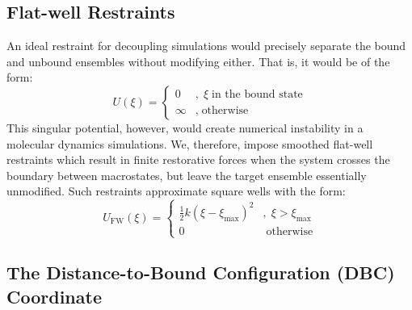\documentclass[9pt,tutorial]{Styling/livecoms}
\begin{document}
\subsection{Flat-well Restraints}

An ideal restraint for decoupling simulations would precisely separate the bound and unbound ensembles without modifying either. That is, it would be of the form:
\begin{equation} \label{eq:squareWell}
    U(\xi) = \begin{cases}
        0 &, \; \xi\; \text{in the bound state}\\
        \infty &, \; \text{otherwise}
    \end{cases}
\end{equation}
\noindent This singular potential, however, would create numerical instability in a molecular dynamics simulations. We, therefore, impose smoothed flat-well restraints which result in finite restorative forces when the system crosses the boundary between macrostates, but leave the target ensemble essentially unmodified. Such restraints approximate square wells with the form:
\begin{equation} \label{eq:harmonicWall}
    U_\mathrm{FW}(\xi) = \begin{cases}
        \frac{1}{2}k \left(\xi-\xi_\mathrm{max}\right)^2 &, \; \xi > \xi_\mathrm{max}\\
        0                                                & \; \text{otherwise}
    \end{cases}
\end{equation}

\subsection{The Distance-to-Bound Configuration (DBC) Coordinate}
\end{document}
